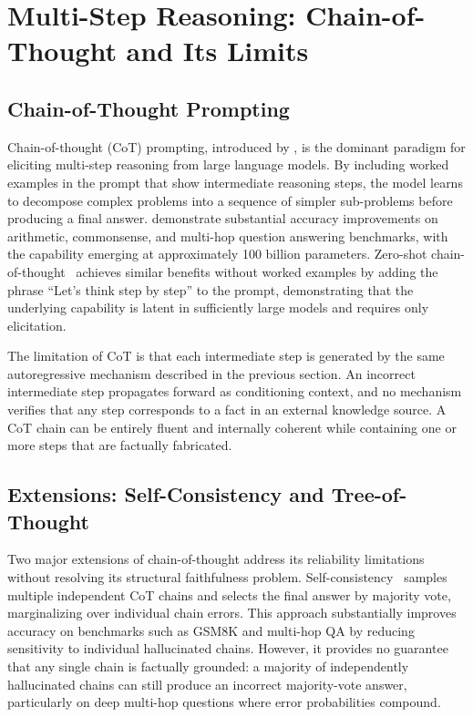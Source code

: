 \section{Multi-Step Reasoning: Chain-of-Thought and Its Limits}
\label{sec:cot}

\subsection{Chain-of-Thought Prompting}

Chain-of-thought (CoT) prompting, introduced by \citet{wei2022cot}, is the dominant paradigm for eliciting multi-step reasoning from large language models. By including worked examples in the prompt that show intermediate reasoning steps, the model learns to decompose complex problems into a sequence of simpler sub-problems before producing a final answer. \citet{wei2022cot} demonstrate substantial accuracy improvements on arithmetic, commonsense, and multi-hop question answering benchmarks, with the capability emerging at approximately 100 billion parameters. Zero-shot chain-of-thought~\citep{kojima2022zero} achieves similar benefits without worked examples by adding the phrase ``Let's think step by step'' to the prompt, demonstrating that the underlying capability is latent in sufficiently large models and requires only elicitation.

The limitation of CoT is that each intermediate step is generated by the same autoregressive mechanism described in the previous section. An incorrect intermediate step propagates forward as conditioning context, and no mechanism verifies that any step corresponds to a fact in an external knowledge source. A CoT chain can be entirely fluent and internally coherent while containing one or more steps that are factually fabricated.

\subsection{Extensions: Self-Consistency and Tree-of-Thought}

Two major extensions of chain-of-thought address its reliability limitations without resolving its structural faithfulness problem. Self-consistency~\citep{wang2023selfconsistency} samples multiple independent CoT chains and selects the final answer by majority vote, marginalizing over individual chain errors. This approach substantially improves accuracy on benchmarks such as GSM8K and multi-hop QA by reducing sensitivity to individual hallucinated chains. However, it provides no guarantee that any single chain is factually grounded: a majority of independently hallucinated chains can still produce an incorrect majority-vote answer, particularly on deep multi-hop questions where error probabilities compound.

